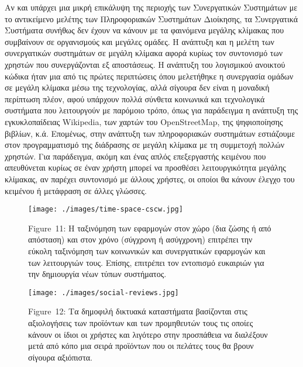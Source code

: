 \documentclass[
]{article}
\begin{document}
Αν και υπάρχει μια μικρή επικάλυψη της περιοχής των Συνεργατικών
Συστημάτων με το αντικείμενο μελέτης των Πληροφοριακών Συστημάτων
Διοίκησης, τα Συνεργατικά Συστήματα συνήθως δεν έχουν να κάνουν με τα
φαινόμενα μεγάλης κλίμακας που συμβαίνουν σε οργανισμούς και μεγάλες
ομάδες. Η ανάπτυξη και η μελέτη των συνεργατικών συστημάτων σε μεγάλη
κλίμακα αφορά κυρίως τον συντονισμό των χρηστών που συνεργάζονται εξ
αποστάσεως. Η ανάπτυξη του λογισμικού ανοικτού κώδικα ήταν μια από τις
πρώτες περιπτώσεις όπου μελετήθηκε η συνεργασία ομάδων σε μεγάλη κλίμακα
μέσω της τεχνολογίας, αλλά σίγουρα δεν είναι η μοναδική περίπτωση πλέον,
αφού υπάρχουν πολλά σύνθετα κοινωνικά και τεχνολογικά συστήματα που
λειτουργούν με παρόμοιο τρόπο, όπως για παράδειγμα η ανάπτυξη της
εγκυκλοπαίδειας Wikipedia, των χαρτών του OpenStreetMap, της
ψηφιοποίησης βιβλίων, κ.ά. Επομένως, στην ανάπτυξη των πληροφοριακών
συστημάτων εστιάζουμε στον προγραμματισμό της διάδρασης σε μεγάλη
κλίμακα με τη συμμετοχή πολλών χρηστών. Για παράδειγμα, ακόμη και ένας
απλός επεξεργαστής κειμένου που απευθύνεται κυρίως σε έναν χρήστη μπορεί
να προσθέσει λειτουργικότητα μεγάλης κλίμακας, αν παρέχει συντονισμό με
άλλους χρήστες, οι οποίοι θα κάνουν έλεγχο του κειμένου ή μετάφραση σε
άλλες γλώσσες.

\leavevmode{}%
\begin{figure}
\hypertarget{fig:time-space-cscw}{%
\centering
\texttt{[image: ./images/time-space-cscw.jpg]}
\caption{Figure~11: Η ταξινόμηση των εφαρμογών στον χώρο (δια ζώσης ή
από απόσταση) και στον χρόνο (σύγχρονη ή ασύγχρονη) επιτρέπει την εύκολη
ταξινόμηση των κοινωνικών και συνεργατικών εφαρμογών και των λειτουργιών
τους. Επίσης, επιτρέπει τον εντοπισμό ευκαιριών για την δημιουργία νέων
τύπων συστήματος.}\label{fig:time-space-cscw}
}
\end{figure}

\leavevmode{}%
\begin{figure}
\hypertarget{fig:social-reviews}{%
\centering
\texttt{[image: ./images/social-reviews.jpg]}
\caption{Figure~12: Τα δημοφιλή δικτυακά καταστήματα βασίζονται στις
αξιολογήσεις των προϊόντων και των προμηθευτών τους τις οποίες κάνουν οι
ίδιοι οι χρήστες και λιγότερο στην προσπάθεια να διαλέξουν μετά από κόπο
μια σειρά προϊόντων που οι πελάτες τους θα βρουν σίγουρα
αξιόπιστα.}\label{fig:social-reviews}
}
\end{figure}
\end{document}
